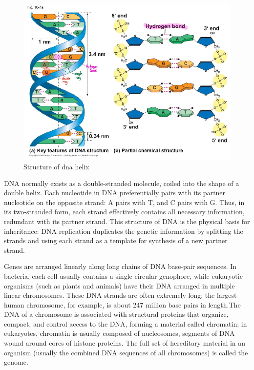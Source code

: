 \begin{figure}[htb] 
	\label{fig:dna_structure}
	\centering
	\includegraphics[width=\textwidth]{figures/dna_structure}
	\caption{Structure of dna helix}
\end{figure}

DNA normally exists as a double-stranded molecule, coiled into the shape of a double helix.
Each nucleotide in DNA preferentially pairs with its partner nucleotide on the opposite strand:
A pairs with T, and C pairs with G. Thus, in its two-stranded form, each strand effectively
contains all necessary information, redundant with its partner strand.
This structure of DNA is the physical basis for inheritance: DNA replication duplicates the
genetic information by splitting the strands and using each strand as a template for synthesis of a
new partner strand.

Genes are arranged linearly along long chains of DNA base-pair sequences. In bacteria, each cell 
usually contains a single circular genophore, while eukaryotic organisms 
(such as plants and animals) have their DNA arranged in multiple linear chromosomes.
These DNA strands are often extremely long; the largest human chromosome, for example,
is about 247 million base pairs in length.The DNA of a chromosome is associated with
structural proteins that organize, compact, and control access to the DNA, forming a material
called chromatin; in eukaryotes, chromatin is usually composed of nucleosomes, 
segments of DNA wound around cores of histone proteins.
The full set of hereditary material in an organism (usually the combined DNA sequences of all 
chromosomes) is called the genome.


